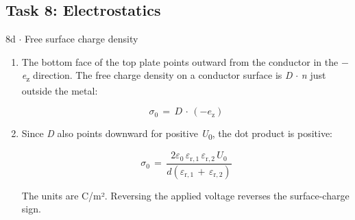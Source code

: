 \documentclass[11pt]{article}
\begin{document}
\begin{keepsection}\subsection{Task 8: Electrostatics}

\begin{workedbox}{8d \ensuremath{\cdot} Free surface charge density}
\begin{enumerate}
\item {}
The bottom face of the top plate points outward from the conductor in the \ensuremath{-}\textit{e}\textsubscript{z} direction. The free charge density on a conductor surface is \textit{D} \ensuremath{\cdot} \textit{n} just outside the metal:

\begin{equation*}σ_{0}\, =\, {D}\, \cdot \, (-{e}_{\mathrm{z}})\end{equation*}
\item {}
Since \textit{D} also points downward for positive \textit{U}\textsubscript{0}, the dot product is positive:

\begin{equation*}σ_{0}\, =\, \dfrac{2ε_{0}\, ε_{\mathrm{r},1}\, ε_{\mathrm{r},2}\, {U}_{0}}{{d}(ε_{\mathrm{r},1}\, +\, ε_{\mathrm{r},2})}\end{equation*}

The units are C/m². Reversing the applied voltage reverses the surface-charge sign.
\end{enumerate}
\end{workedbox}

\end{keepsection}
\end{document}
